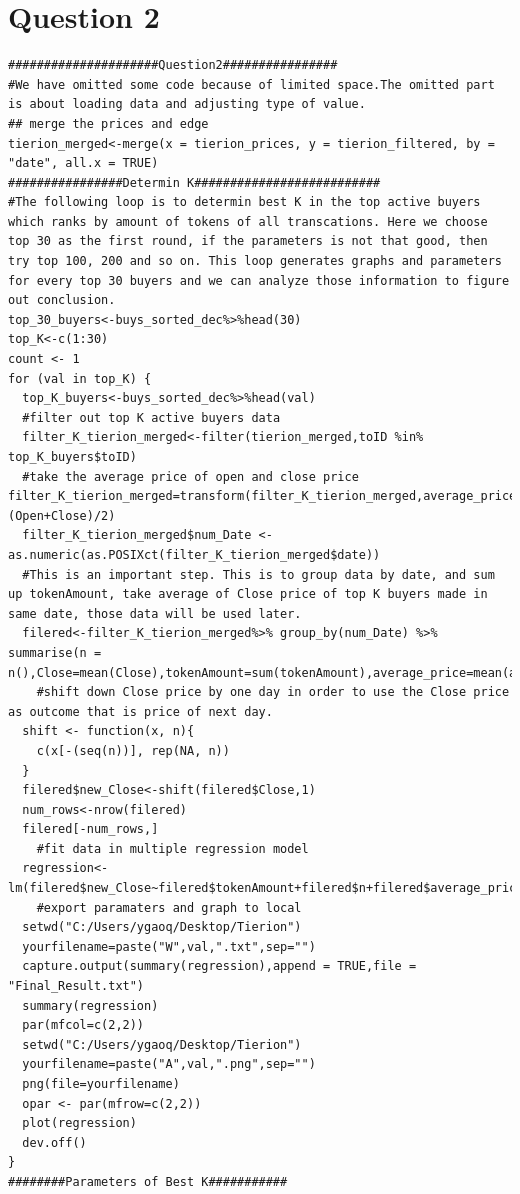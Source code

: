 \documentclass[11pt, letterpaper]{article} %
\begin{document}
\section{Question 2}
\begin{lstlisting}
#####################Question2################
#We have omitted some code because of limited space.The omitted part is about loading data and adjusting type of value.
## merge the prices and edge
tierion_merged<-merge(x = tierion_prices, y = tierion_filtered, by = "date", all.x = TRUE)
################Determin K##########################
#The following loop is to determin best K in the top active buyers which ranks by amount of tokens of all transcations. Here we choose top 30 as the first round, if the parameters is not that good, then try top 100, 200 and so on. This loop generates graphs and parameters for every top 30 buyers and we can analyze those information to figure out conclusion.
top_30_buyers<-buys_sorted_dec%>%head(30)
top_K<-c(1:30)
count <- 1
for (val in top_K) {
  top_K_buyers<-buys_sorted_dec%>%head(val)
  #filter out top K active buyers data
  filter_K_tierion_merged<-filter(tierion_merged,toID %in% top_K_buyers$toID)
  #take the average price of open and close price filter_K_tierion_merged=transform(filter_K_tierion_merged,average_price= (Open+Close)/2)
  filter_K_tierion_merged$num_Date <-  as.numeric(as.POSIXct(filter_K_tierion_merged$date))
  #This is an important step. This is to group data by date, and sum up tokenAmount, take average of Close price of top K buyers made in same date, those data will be used later.
  filered<-filter_K_tierion_merged%>% group_by(num_Date) %>% summarise(n = n(),Close=mean(Close),tokenAmount=sum(tokenAmount),average_price=mean(average_price))
	#shift down Close price by one day in order to use the Close price as outcome that is price of next day.
  shift <- function(x, n){
    c(x[-(seq(n))], rep(NA, n))
  }
  filered$new_Close<-shift(filered$Close,1)
  num_rows<-nrow(filered)
  filered[-num_rows,]
	#fit data in multiple regression model
  regression<-lm(filered$new_Close~filered$tokenAmount+filered$n+filered$average_price)
	#export paramaters and graph to local
  setwd("C:/Users/ygaoq/Desktop/Tierion")
  yourfilename=paste("W",val,".txt",sep="")
  capture.output(summary(regression),append = TRUE,file = "Final_Result.txt")
  summary(regression)
  par(mfcol=c(2,2))
  setwd("C:/Users/ygaoq/Desktop/Tierion")
  yourfilename=paste("A",val,".png",sep="")
  png(file=yourfilename)
  opar <- par(mfrow=c(2,2))
  plot(regression)
  dev.off()
}
########Parameters of Best K###########

\end{lstlisting}
\end{document}
